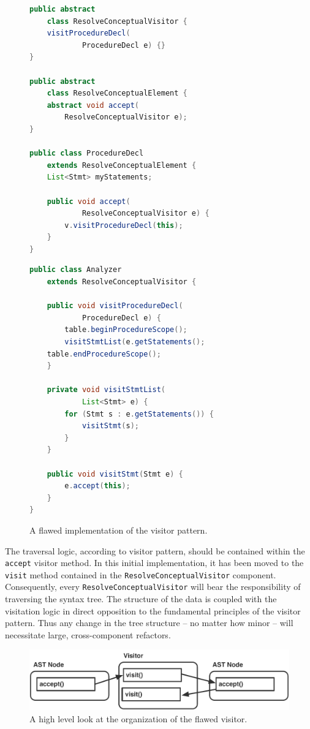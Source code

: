 \documentclass[times]{speauth}
\begin{document}
\begin{figure}
\centering
\begin{minipage}{.45\textwidth}
\begin{lstlisting}[language=java]
public abstract
	class ResolveConceptualVisitor {
    visitProcedureDecl(
    		ProcedureDecl e) {}
}

public abstract
	class ResolveConceptualElement {
    abstract void accept(
        ResolveConceptualVisitor e);
}

public class ProcedureDecl
	extends ResolveConceptualElement {	
    List<Stmt> myStatements;

    public void accept(
    		ResolveConceptualVisitor e) {
        v.visitProcedureDecl(this);
    }
}
\end{lstlisting}
\end{minipage}\quad
\begin{minipage}{.45\textwidth}
\begin{lstlisting}[language=java]
public class Analyzer
	extends ResolveConceptualVisitor {
	
    public void visitProcedureDecl(
  			ProcedureDecl e) {
        table.beginProcedureScope();
        visitStmtList(e.getStatements();
	table.endProcedureScope();
    }

    private void visitStmtList(
    		List<Stmt> e) {
        for (Stmt s : e.getStatements()) {
            visitStmt(s);
        }
    }

    public void visitStmt(Stmt e) {
        e.accept(this);
    }
}
\end{lstlisting}
\end{minipage}
\caption{A flawed implementation of the visitor pattern.}
\label{fig:flawedvisitorexample}
\end{figure}

The traversal logic, according to visitor pattern, should be contained within the \texttt{accept} visitor method. In this initial implementation, it has been moved to the \texttt{visit} method contained in the \texttt{ResolveConceptualVisitor} component. Consequently, every \texttt{ResolveConceptualVisitor} will bear the responsibility of traversing the syntax tree. The structure of the data is coupled with the visitation logic in direct opposition to the fundamental principles of the visitor pattern. Thus any change in the tree structure -- no matter how minor -- will necessitate large, cross-component refactors.

\begin{figure}[!htb]
\centering
\includegraphics[scale=.60]{figures/flawed_visitor_organization.pdf}
\caption{A high level look at the organization of the flawed visitor.}
\label{fig:flawedvisitororganization}
\end{figure}
\end{document}
